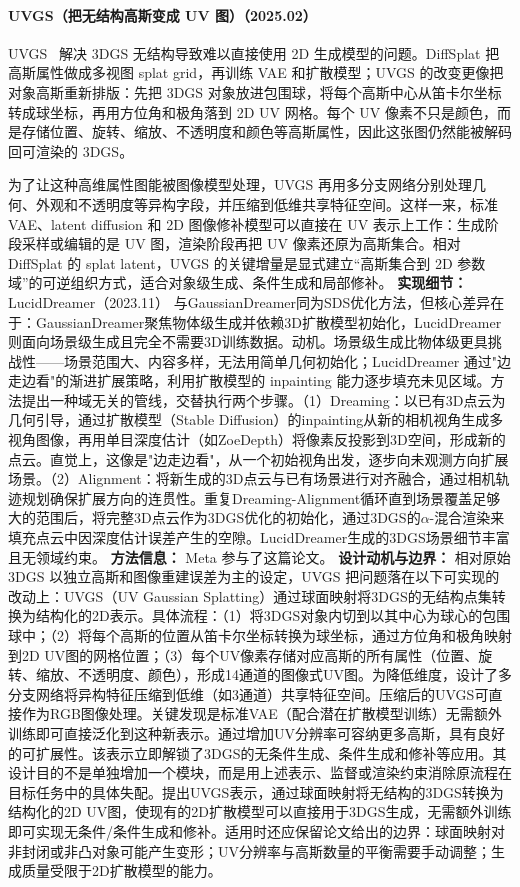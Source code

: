 \paragraph{UVGS（把无结构高斯变成 UV 图）（2025.02）}
UVGS~\cite{2502_01846} 解决 3DGS 无结构导致难以直接使用 2D 生成模型的问题。DiffSplat 把高斯属性做成多视图 splat grid，再训练 VAE 和扩散模型；UVGS 的改变更像把对象高斯重新排版：先把 3DGS 对象放进包围球，将每个高斯中心从笛卡尔坐标转成球坐标，再用方位角和极角落到 2D UV 网格。每个 UV 像素不只是颜色，而是存储位置、旋转、缩放、不透明度和颜色等高斯属性，因此这张图仍然能被解码回可渲染的 3DGS。

为了让这种高维属性图能被图像模型处理，UVGS 再用多分支网络分别处理几何、外观和不透明度等异构字段，并压缩到低维共享特征空间。这样一来，标准 VAE、latent diffusion 和 2D 图像修补模型可以直接在 UV 表示上工作：生成阶段采样或编辑的是 UV 图，渲染阶段再把 UV 像素还原为高斯集合。相对 DiffSplat 的 splat latent，UVGS 的关键增量是显式建立“高斯集合到 2D 参数域”的可逆组织方式，适合对象级生成、条件生成和局部修补。
\textbf{实现细节：} LucidDreamer（2023.11） 与GaussianDreamer同为SDS优化方法，但核心差异在于：GaussianDreamer聚焦物体级生成并依赖3D扩散模型初始化，LucidDreamer则面向场景级生成且完全不需要3D训练数据。动机。场景级生成比物体级更具挑战性——场景范围大、内容多样，无法用简单几何初始化；LucidDreamer 通过"边走边看"的渐进扩展策略，利用扩散模型的 inpainting 能力逐步填充未见区域。方法提出一种域无关的管线，交替执行两个步骤。（1）Dreaming：以已有3D点云为几何引导，通过扩散模型（Stable Diffusion）的inpainting从新的相机视角生成多视角图像，再用单目深度估计（如ZoeDepth）将像素反投影到3D空间，形成新的点云。直觉上，这像是"边走边看"，从一个初始视角出发，逐步向未观测方向扩展场景。（2）Alignment：将新生成的3D点云与已有场景进行对齐融合，通过相机轨迹规划确保扩展方向的连贯性。重复Dreaming-Alignment循环直到场景覆盖足够大的范围后，将完整3D点云作为3DGS优化的初始化，通过3DGS的$\alpha$-混合渲染来填充点云中因深度估计误差产生的空隙。LucidDreamer生成的3DGS场景细节丰富且无领域约束。
\textbf{方法信息：} Meta 参与了这篇论文。
\textbf{设计动机与边界：} 相对原始 3DGS 以独立高斯和图像重建误差为主的设定，UVGS 把问题落在以下可实现的改动上：UVGS（UV Gaussian Splatting）通过球面映射将3DGS的无结构点集转换为结构化的2D表示。具体流程：（1）将3DGS对象内切到以其中心为球心的包围球中；（2）将每个高斯的位置从笛卡尔坐标转换为球坐标，通过方位角和极角映射到2D UV图的网格位置；（3）每个UV像素存储对应高斯的所有属性（位置、旋转、缩放、不透明度、颜色），形成14通道的图像式UV图。为降低维度，设计了多分支网络将异构特征压缩到低维（如3通道）共享特征空间。压缩后的UVGS可直接作为RGB图像处理。关键发现是标准VAE（配合潜在扩散模型训练）无需额外训练即可直接泛化到这种新表示。通过增加UV分辨率可容纳更多高斯，具有良好的可扩展性。该表示立即解锁了3DGS的无条件生成、条件生成和修补等应用。其设计目的不是单独增加一个模块，而是用上述表示、监督或渲染约束消除原流程在目标任务中的具体失配。提出UVGS表示，通过球面映射将无结构的3DGS转换为结构化的2D UV图，使现有的2D扩散模型可以直接用于3DGS生成，无需额外训练即可实现无条件/条件生成和修补。适用时还应保留论文给出的边界：球面映射对非封闭或非凸对象可能产生变形；UV分辨率与高斯数量的平衡需要手动调整；生成质量受限于2D扩散模型的能力。
